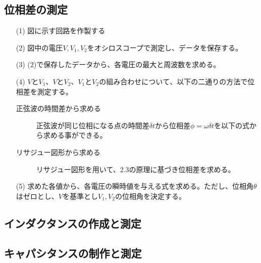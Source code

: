 \documentclass[dvipdfmx]{jsarticle}
\begin{document}
\subsection{位相差の測定}
\begin{itemize}
  \item [(1)]図に示す回路を作製する
  \item [(2)]図中の電圧$V, V_1, V_2$をオシロスコープで測定し、データを保存する。
  \item [(3)](2)で保存したデータから、各電圧の最大と周波数を求める。
  \item [(4)]$VとV_1、VとV_2、V_1とV_2の組み合わせについて$、以下の二通りの方法で位相差を測定する。
    \begin{description}
      \item [正弦波の時間差から求める]正弦波が同じ位相になる点の時間差$\delta t$から位相差$\phi = \omega \delta t$を以下の式から求める事ができる。
      \item [リサジュー図形から求める]リサジュー図形を用いて、2.3の原理に基づき位相差を求める。
    \end{description}
  \item[(5)]求めた各値から、各電圧の瞬時値を与える式を求める。ただし、位相角$\theta$はゼロとし、$V$を基準とし$V_1, V_2$の位相角を決定する。
\end{itemize}
\subsection{インダクタンスの作成と測定}
\subsection{キャパシタンスの制作と測定}
\end{document}
